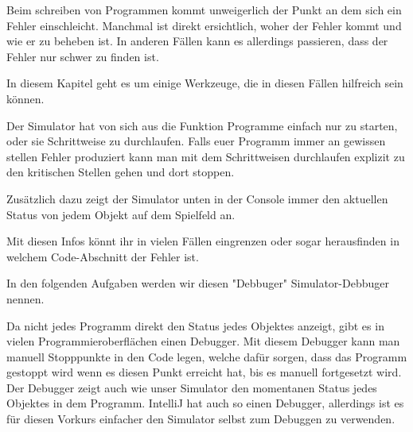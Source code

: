 

Beim schreiben von Programmen kommt unweigerlich der Punkt an dem sich ein Fehler einschleicht.
Manchmal ist direkt ersichtlich, woher der Fehler kommt und wie er zu beheben ist.
In anderen Fällen kann es allerdings passieren, dass der Fehler nur schwer zu finden ist.

In diesem Kapitel geht es um einige Werkzeuge, die in diesen Fällen hilfreich sein können.

\begin{Infobox}
Der Simulator hat von sich aus die Funktion Programme einfach nur zu starten, oder sie Schrittweise zu durchlaufen. Falls euer Programm immer an gewissen stellen Fehler produziert kann man mit dem Schrittweisen durchlaufen explizit zu den kritischen Stellen gehen und dort stoppen.

Zusätzlich dazu zeigt der Simulator unten in der Console immer den aktuellen Status von jedem Objekt auf dem Spielfeld an. 

Mit diesen Infos könnt ihr in vielen Fällen eingrenzen oder sogar herausfinden in welchem Code-Abschnitt der Fehler ist.

In den folgenden Aufgaben werden wir diesen "Debbuger" Simulator-Debbuger nennen.
\end{Infobox}

\begin{Infobox}
    Da nicht jedes Programm direkt den Status jedes Objektes anzeigt, gibt es in vielen Programmieroberflächen einen Debugger. Mit diesem Debugger kann man manuell Stopppunkte in den Code legen, welche dafür sorgen, dass das Programm gestoppt wird wenn es diesen Punkt erreicht hat, bis es manuell fortgesetzt wird. Der Debugger zeigt auch wie unser Simulator den momentanen Status jedes Objektes in dem Programm. IntelliJ hat auch so einen Debugger, allerdings ist es für diesen Vorkurs einfacher den Simulator selbst zum Debuggen zu verwenden.
\end{Infobox}

\addexcercise

\addexcercise